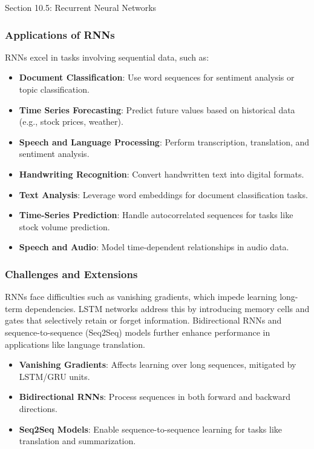 \begin{notes}{Section 10.5: Recurrent Neural Networks}
    \subsubsection*{Applications of RNNs}
    
    RNNs excel in tasks involving sequential data, such as:
    \begin{itemize}
        \item \textbf{Document Classification}: Use word sequences for sentiment analysis or topic classification.
        \item \textbf{Time Series Forecasting}: Predict future values based on historical data (e.g., stock prices, weather).
        \item \textbf{Speech and Language Processing}: Perform transcription, translation, and sentiment analysis.
        \item \textbf{Handwriting Recognition}: Convert handwritten text into digital formats.
    \end{itemize}
    
    \begin{highlight}
        \begin{itemize}
            \item \textbf{Text Analysis}: Leverage word embeddings for document classification tasks.
            \item \textbf{Time-Series Prediction}: Handle autocorrelated sequences for tasks like stock volume prediction.
            \item \textbf{Speech and Audio}: Model time-dependent relationships in audio data.
        \end{itemize}
    \end{highlight}
    
    \subsubsection*{Challenges and Extensions}
    
    RNNs face difficulties such as vanishing gradients, which impede learning long-term dependencies. LSTM networks address this by introducing memory cells and gates that selectively retain or forget 
    information. Bidirectional RNNs and sequence-to-sequence (Seq2Seq) models further enhance performance in applications like language translation.
    
    \begin{highlight}
        \begin{itemize}
            \item \textbf{Vanishing Gradients}: Affects learning over long sequences, mitigated by LSTM/GRU units.
            \item \textbf{Bidirectional RNNs}: Process sequences in both forward and backward directions.
            \item \textbf{Seq2Seq Models}: Enable sequence-to-sequence learning for tasks like translation and summarization.
        \end{itemize}
    \end{highlight}
    

\end{notes}
